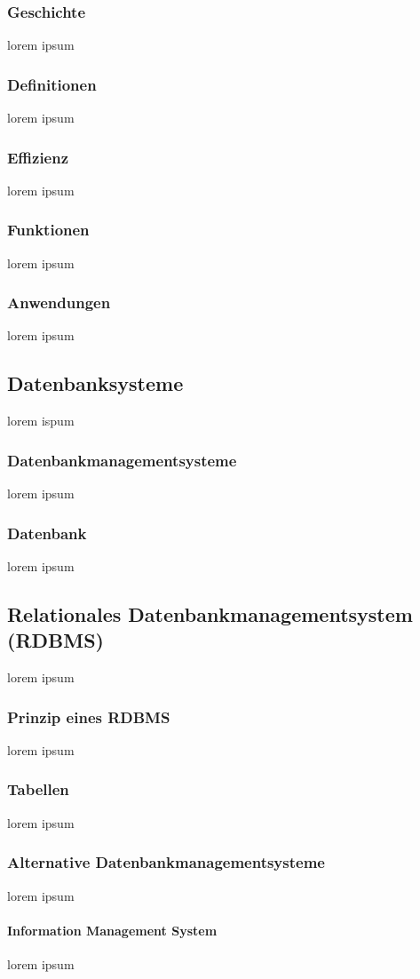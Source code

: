 \documentclass[12pt,a4paper]{report}
\begin{document}
\subsubsection{Geschichte}
lorem ipsum
\subsubsection{Definitionen}
lorem ipsum
\subsubsection{Effizienz}
lorem ipsum
\subsubsection{Funktionen}
lorem ipsum
\subsubsection{Anwendungen}
lorem ipsum
\subsection{Datenbanksysteme}
lorem ispum
\subsubsection{Datenbankmanagementsysteme}
lorem ipsum
\subsubsection{Datenbank}
lorem ipsum
\subsection{Relationales Datenbankmanagementsystem (RDBMS)}
lorem ipsum
\subsubsection{Prinzip eines RDBMS}
lorem ipsum
\subsubsection{Tabellen}
lorem ipsum
\subsubsection{Alternative Datenbankmanagementsysteme}
lorem ipsum
\paragraph{Information Management System}
lorem ipsum
\end{document}
